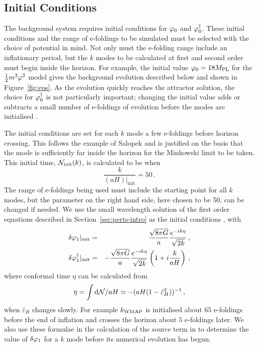 \subsection{Initial Conditions} 
\label{sec:initconds-num}

The background system requires initial conditions for $\varphi_{0}$ and
$\varphi_{0}^{\dagger}$. These initial conditions and the range of
e-foldings to be simulated must be selected with the choice of
potential in mind. Not only must the
e-folding range include an inflationary period, but the $k$ modes to
be calculated at first and second order must begin inside the horizon. For example,
the initial value $\varphi_0 = 18M_{\mathrm{PL}}$ for the
$\frac{1}{2} m^2 \varphi^2$ model 
gives the background evolution described below and shown in Figure~\ref{fig:eps}. As
the evolution quickly reaches the attractor solution, the choice for $\varphi_0^{\dagger}$
is not particularly important; changing the initial value adds or subtracts a small
number of e-foldings of evolution before the modes are initialised
\cite{Ringeval:2007am, Martin:2006rs}.


The initial conditions are set for each $k$ mode a few e-foldings
before horizon crossing. This follows the example of Salopek
\etal
\cite{Salopek:1988qh} and is justified on the basis that the mode is
sufficiently far inside the
horizon for the Minkowski limit to be taken. This initial time,
$\mathcal{N}_{\mathrm{init}}(k)$, is calculated to be when
%  
\begin{equation}
 \frac{k}{(aH)|_{\mathrm{init}}} = 50 \,.
\end{equation}
%
The range of e-foldings being used must include the starting point for
all $k$ modes, but the parameter on the right hand side, here chosen to
be 50, can be changed if needed.  We use the small wavelength solution
of the first order equations described in Section~\ref{sec:perts-intro} as the
initial conditions \cite{Salopek:1988qh}, with
%
\begin{eqnarray}
\label{eq:foics}
 \delta\varphi_{1}|_{\mathrm{init}} &=& \frac{\sqrt{8\pi G}}{a}
\frac{e^{-i k\eta}}{\sqrt{2k}} \,,\\
 \delta\varphi_{1}^{\dagger}|_{\mathrm{init}} &=& -\frac{\sqrt{8\pi G}}{a}
\frac{e^{-i k\eta}}{\sqrt{2k}} \left(1 + i \frac{k}{a H}\right) \,,
\end{eqnarray}
%
where conformal time $\eta$ can be calculated from 
% 
\begin{equation}
\label{eq:etacalc-num}
\eta=\int \mathrm{d}\mathcal{N}/aH \simeq
-(aH(1-\bar{\varepsilon}^2_H))^{-1}\,,
\end{equation} 
% 
when $\bar{\varepsilon}_H$ changes slowly. For
example $k_\mathrm{WMAP}$ is initialised
about $65$ e-foldings before the end of inflation and crosses the horizon about $5$ e-foldings
later.
We also use these formulae in the calculation of the source term in  to
determine the value of $\delta\varphi_{1}$ for a $k$ mode before its numerical evolution has
begun.


